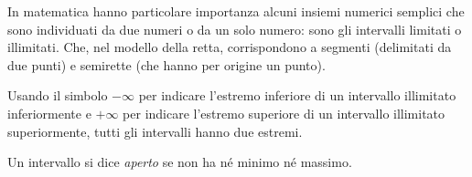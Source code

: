 % 
% 

In matematica hanno particolare importanza alcuni insiemi numerici semplici 
che sono individuati da due numeri o da un solo numero: sono gli intervalli 
limitati o illimitati.
Che, nel modello della retta, corrispondono a segmenti (delimitati da due 
punti) e semirette (che hanno per origine un punto).

\vspace{.5em}

\vspace{.5em}
Usando il simbolo \(-\infty\) 
per indicare l'estremo inferiore di un intervallo illimitato inferiormente 
e \(+\infty\) 
per indicare l'estremo superiore di un intervallo illimitato superiormente, 
tutti gli intervalli hanno due estremi.

\begin{newdef}{}{}
Un intervallo si dice \emph{aperto} se non ha né minimo né massimo.
\end{newdef}


